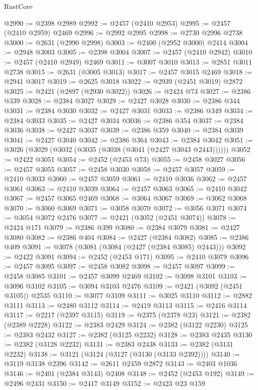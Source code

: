 \begin{lexlean}{RustCore}
\begin{coremodule}
@2990 := @2398 @2989
@2992 := @2457 (@2410 @2953)
@2995 := @2457 (@2410 @2959) @2469
@2996 := @2992 @2995
@2998 := @2730 @2996 @2738
@3000 := @2631 (@2990 @2998)
@3003 := @2400 (@2952 @3000) @2414
@3004 := @2948 @3003
@3005 := @2398 @3004
@3007 := @2457 (@2410 @2942)
@3010 := @2457 (@2410 @2949) @2469
@3011 := @3007 @3010
@3013 := @2851 @3011 @2738
@3015 := @2631 (@3005 @3013)
@3017 := @2457 @3015 @2469
@3018 := @2941 @3017
@3019 := @2625 @3018
@3022 := @2939 (@2451 @3019) @2872
@3025 := @2421 (@2897 (@2930 @3022))
@3026 := @2424 @73
@3027 := @2386 @339
@3028 := @2384 @3027
@3029 := @2427 @3028
@3030 := @2386 @344
@3031 := @2384 @3030
@3032 := @2427 @3031
@3033 := @2386 @349
@3034 := @2384 @3033
@3035 := @2427 @3034
@3036 := @2386 @354
@3037 := @2384 @3036
@3038 := @2427 @3037
@3039 := @2386 @359
@3040 := @2384 @3039
@3041 := @2427 @3040
@3042 := @2386 @364
@3043 := @2384 @3042
@3051 := @3026 (@3029 (@3032 (@3035 (@3038 (@3041 (@2427 @3043 @2443))))))
@3052 := @2422 @3051
@3054 := @2452 (@2453 @73)
@3055 := @2458 @3027
@3056 := @2457 @3055
@3057 := @2458 @3030
@3058 := @2457 @3057
@3059 := @2410 @3033
@3060 := @2457 @3059
@3061 := @2410 @3036
@3062 := @2457 @3061
@3063 := @2410 @3039
@3064 := @2457 @3063
@3065 := @2410 @3042
@3067 := @2457 @3065 @2469
@3068 := @3064 @3067
@3069 := @3062 @3068
@3070 := @3060 @3069
@3071 := @3058 @3070
@3072 := @3056 @3071
@3074 := @3054 @3072 @2476
@3077 := @2421 (@3052 (@2451 @3074))
@3078 := @2424 @171
@3079 := @2386 @399
@3080 := @2384 @3079
@3081 := @2427 @3080
@3082 := @2386 @404
@3084 := @2427 (@2384 @3082)
@3085 := @2386 @409
@3091 := @3078 (@3081 (@3084 (@2427 (@2384 @3085) @2443)))
@3092 := @2422 @3091
@3094 := @2452 (@2453 @171)
@3095 := @2410 @3079
@3096 := @2457 @3095
@3097 := @2458 @3082
@3098 := @2457 @3097
@3099 := @2458 @3085
@3101 := @2457 @3099 @2469
@3102 := @3098 @3101
@3103 := @3096 @3102
@3105 := @3094 @3103 @2476
@3109 := @2421 (@3092 (@2451 @3105)) @2535
@3110 := @3077 @3109
@3111 := @3025 @3110
@3112 := @2882 @3111
@3113 := @2480 @3112
@3114 := @2419 @3113
@3115 := @2416 @3114
@3117 := @2217 (@2397 @3115)
@3119 := @2375 (@2378 @23)
@3121 := @2382 (@2389 @2228)
@3122 := @2383 @2429
@3124 := @2382 (@3122 @2230)
@3125 := @2383 @2432
@3127 := @2382 (@3125 @2232)
@3128 := @2383 @2435
@3130 := @2382 (@3128 @2232)
@3131 := @2383 @2438
@3133 := @2382 (@3131 @2232)
@3138 := @3121 (@3124 (@3127 (@3130 (@3133 @2392))))
@3140 := @3119 @3138 @2396
@3142 := @2611 @2459 @2872
@3143 := @2403 @1036
@3146 := @2401 (@2384 @3143) @2408
@3148 := @2452 (@2453 @192)
@3149 := @2496 @2431
@3150 := @2417 @3149
@3152 := @2423 @23 @159

\end{coremodule}
\end{lexlean}
